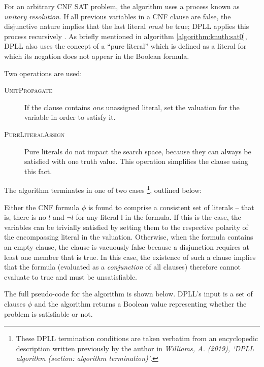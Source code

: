 \documentclass[a4paper,openany,12pt]{book}
\begin{document}
For an arbitrary CNF SAT problem, the algorithm uses a process known as \emph{unitary resolution}.
If all previous variables in a CNF clause are false, the disjunctive nature implies that the last literal \emph{must} be
true; DPLL applies this process recursively \citep{russell2016artificial}.
As briefly mentioned in algorithm \ref{algorithm:knuth:sat0}, DPLL also uses the concept of a ``pure literal'' which is
defined as a literal for which its negation does not appear in the Boolean formula.

Two operations are used:

\begin{description}
    \item[\textsc{UnitPropagate}] If the clause contains \emph{one} unassigned literal,
                                  set the valuation for the variable in order to satisfy it.
    \item[\textsc{PureLiteralAssign}] Pure literals do not impact the search space, because they can always be satisfied
                                      with one truth value.
                                      This operation simplifies the clause using this fact.
\end{description}

The algorithm terminates in one of two cases \footnote{%
    These DPLL termination conditions are taken verbatim from an encyclopedic description written previously by the
    author in \emph{Williams, A. (2019), `DPLL algorithm (section: algorithm termination)'}.
}, outlined below:

Either the CNF formula $\phi$ is found to comprise a consistent set of literals -- that is, there is no $l$ and $\neg l$
for any literal l in the formula.
If this is the case, the variables can be trivially satisfied by setting them to the respective polarity of the
encompassing literal in the valuation.
Otherwise, when the formula contains an empty clause, the clause is vacuously false because a disjunction requires at
least one member that is true.
In this case, the existence of such a clause implies that the formula (evaluated as a \emph{conjunction} of all clauses)
therefore cannot evaluate to true and must be unsatisfiable.

The full pseudo-code for the algorithm is shown below.
DPLL's input is a set of clauses $\phi$ and the algorithm returns a Boolean value representing whether the problem is
satisfiable or not.\\

\newcommand{\mycomment}[1]{\textcolor{dgrey}{\textit{// #1 }}}
\end{document}
